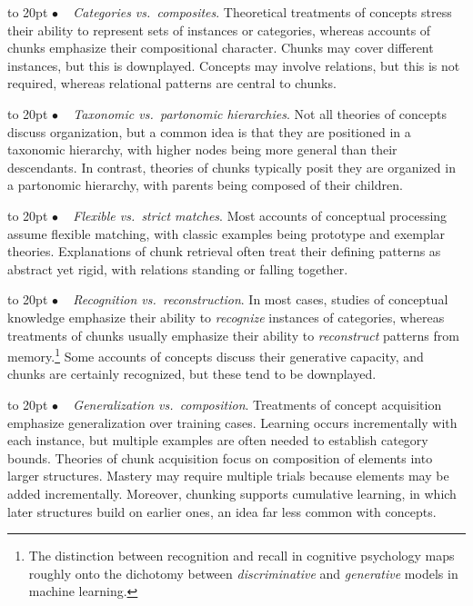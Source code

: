 \documentclass[11pt,letterpaper]{article}
\def\texitem#1{\par\noindent\hangindent 20pt
               \hbox to 20pt {\hss #1 ~}\ignorespaces}
\def\bull{\texitem{$\bullet$}}
\begin{document}
\vskip 0.05in

\bull
{\it Categories vs.\ composites\/}. 
Theoretical treatments of concepts stress their ability to represent 
sets of instances or categories, whereas accounts of chunks emphasize
their compositional character. Chunks may cover different instances,
but this is downplayed. Concepts may involve relations, but this is
not required, whereas relational patterns are central to chunks.


\bull
{\it Taxonomic vs.\ partonomic hierarchies\/}. 
Not all theories of concepts discuss organization, but a common idea
is that they are positioned in a taxonomic hierarchy, with higher nodes 
being more general than their descendants. In contrast, theories of
chunks typically posit they are organized in a partonomic hierarchy,
with parents being composed of their children. 

\bull
{\it Flexible vs.\ strict matches\/}. 
Most accounts of conceptual processing assume flexible matching, with
classic examples being prototype and exemplar theories. Explanations
of chunk retrieval often treat their defining patterns as abstract 
yet rigid, with relations standing or falling together. 


\bull
{\it Recognition vs.\ reconstruction\/}.  
In most cases, studies of conceptual knowledge emphasize their
ability to {\it recognize\/} instances of categories, whereas
treatments of chunks usually emphasize their ability to 
{\it reconstruct\/} patterns from memory.\footnote{The distinction
between recognition and recall in cognitive psychology maps roughly 
onto the dichotomy between {\it discriminative\/} and {\it generative\/}
models in machine learning.} Some accounts of concepts discuss their
generative capacity, and chunks are certainly recognized, but these
tend to be downplayed. 

\bull
{\it Generalization vs.\ composition\/}.  
Treatments of concept acquisition emphasize generalization over
training cases. Learning occurs incrementally with each instance,
but multiple examples are often needed to establish category bounds.
Theories of chunk acquisition focus on composition of elements into
larger structures. Mastery may require multiple trials because elements
may be added incrementally. Moreover, chunking supports cumulative 
learning, in which later structures build on earlier ones, an idea
far less common with concepts. 
\end{document}
